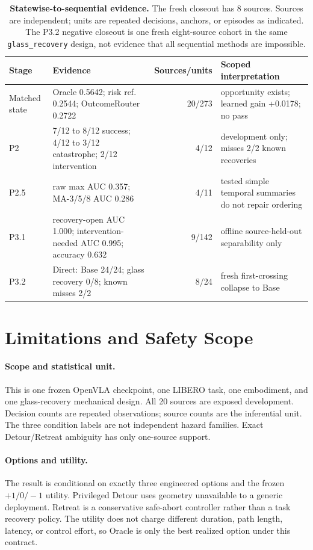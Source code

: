 \documentclass[10pt]{article}
\begin{document}
\begin{table}[H]
\centering
\small
\begin{tabularx}{\linewidth}{@{}l Y r Y@{}}
\toprule
Stage & Evidence & Sources/units & Scoped interpretation \\
\midrule
Matched state & Oracle 0.5642; risk ref. 0.2544; OutcomeRouter 0.2722 & 20/273 & opportunity exists; learned gain +0.0178; no pass \\
P2 & 7/12 to 8/12 success; 4/12 to 3/12 catastrophe; 2/12 intervention & 4/12 & development only; misses 2/2 known recoveries \\
P2.5 & raw max AUC 0.357; MA-3/5/8 AUC 0.286 & 4/11 & tested simple temporal summaries do not repair ordering \\
P3.1 & recovery-open AUC 1.000; intervention-needed AUC 0.995; accuracy 0.632 & 9/142 & offline source-held-out separability only \\
P3.2 & Direct: Base 24/24; glass recovery 0/8; known misses 2/2 & 8/24 & fresh first-crossing collapse to Base \\
\bottomrule
\end{tabularx}
\caption{\textbf{Statewise-to-sequential evidence.} The fresh closeout has 8
sources. Sources are independent;
units are repeated decisions, anchors, or episodes as indicated. The P3.2
negative closeout is one fresh eight-source cohort in the same
\texttt{glass\_recovery} design, not evidence that all sequential methods are
impossible.}
\label{tab:sequential}
\end{table}

\section{Limitations and Safety Scope}

\paragraph{Scope and statistical unit.}
This is one frozen OpenVLA checkpoint, one LIBERO task, one embodiment, and one
glass-recovery mechanical design. All 20 sources are exposed development.
Decision counts are repeated observations; source counts are the inferential
unit. The three condition labels are not independent hazard families. Exact
Detour/Retreat ambiguity has only one-source support.

\paragraph{Options and utility.}
The result is conditional on exactly three engineered options and the frozen
$+1/0/-1$ utility. Privileged Detour uses geometry unavailable to a generic
deployment. Retreat is a conservative safe-abort controller rather than a task
recovery policy. The utility does not charge different duration, path length,
latency, or control effort, so Oracle is only the best realized option under
this contract.
\end{document}
